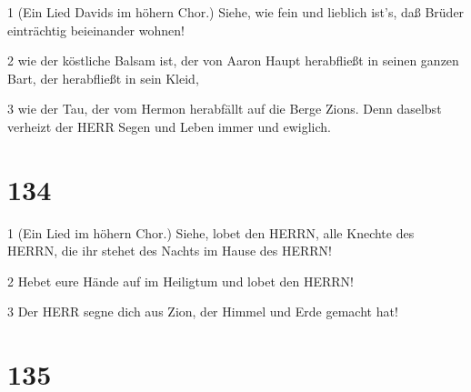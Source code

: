 \par 1 (Ein Lied Davids im höhern Chor.) Siehe, wie fein und lieblich ist's, daß Brüder einträchtig beieinander wohnen!
\par 2 wie der köstliche Balsam ist, der von Aaron Haupt herabfließt in seinen ganzen Bart, der herabfließt in sein Kleid,
\par 3 wie der Tau, der vom Hermon herabfällt auf die Berge Zions. Denn daselbst verheizt der HERR Segen und Leben immer und ewiglich.

\chapter{134}

\par 1 (Ein Lied im höhern Chor.) Siehe, lobet den HERRN, alle Knechte des HERRN, die ihr stehet des Nachts im Hause des HERRN!
\par 2 Hebet eure Hände auf im Heiligtum und lobet den HERRN!
\par 3 Der HERR segne dich aus Zion, der Himmel und Erde gemacht hat!

\chapter{135}

